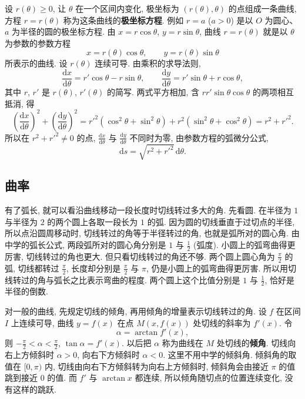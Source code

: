 \documentclass[UTF8,openany]{ctexbook}
\theoremstyle{chinesetextbook}
\newcommand{\dd}{\mathrm d}
\begin{document}
设 $r(\theta)\ge0$, 让 $\theta$ 在一个区间内变化, 极坐标为 $(r(\theta),\theta)$ 的点组成一条曲线, 方程 $r=r(\theta)$ 称为这条曲线的\textbf{极坐标方程}. 例如 $r=a$ ($a>0$) 是以 $O$ 为圆心、$a$ 为半径的圆的极坐标方程. 由 $x=r\cos\theta$, $y=r\sin\theta$, 曲线 $r=r(\theta)$ 就是以 $\theta$ 为参数的参数方程
\[
x=r(\theta)\cos\theta,\qquad y=r(\theta)\sin\theta
\]
所表示的曲线. 设 $r(\theta)$ 连续可导. 由乘积的求导法则,
\[
\frac{\dd x}{\dd\theta}=r'\cos\theta-r\sin\theta,\qquad\frac{\dd y}{\dd\theta}=r'\sin\theta+r\cos\theta,
\]
其中 $r$, $r'$ 是 $r(\theta)$, $r'(\theta)$ 的简写. 两式平方相加, 含 $rr'\sin\theta\cos\theta$ 的两项相互抵消, 得
\[
\left(\frac{\dd x}{\dd\theta}\right)^2+\left(\frac{\dd y}{\dd\theta}\right)^2=r'^2(\cos^2\theta+\sin^2\theta)+r^2(\sin^2\theta+\cos^2\theta)=r^2+r'^2.
\]
所以在 $r^2+r'^2\ne0$ 的点, $\displaystyle\frac{\dd x}{\dd\theta}$ 与 $\displaystyle\frac{\dd y}{\dd\theta}$ 不同时为零, 由参数方程的弧微分公式,
\[
\dd s=\sqrt{r^2+r'^2}\,\dd\theta.
\]
\subsection{曲率}
有了弧长, 就可以看沿曲线移动一段长度时切线转过多大的角. 先看圆. 在半径为 $1$ 与半径为 $2$ 的两个圆上各取一段长为 $1$ 的弧. 因为圆的切线垂直于过切点的半径, 所以点沿圆周移动时, 切线转过的角等于半径转过的角, 也就是弧所对的圆心角. 由中学的弧长公式, 两段弧所对的圆心角分别是 $1$ 与 $\displaystyle\frac12$ (弧度). 小圆上的弧弯曲得更厉害, 切线转过的角也更大. 但只看切线转过的角还不够. 两个圆上圆心角为 $\displaystyle\frac\pi2$ 的弧, 切线都转过 $\displaystyle\frac\pi2$, 长度却分别是 $\displaystyle\frac\pi2$ 与 $\pi$, 仍是小圆上的弧弯曲得更厉害. 所以用切线转过的角与弧长之比表示弯曲的程度. 两个圆上这个比值分别是 $1$ 与 $\displaystyle\frac12$, 恰好是半径的倒数.

对一般的曲线, 先规定切线的倾角, 再用倾角的增量表示切线转过的角. 设 $f$ 在区间 $I$ 上连续可导, 曲线 $y=f(x)$ 在点 $M(x,f(x))$ 处切线的斜率为 $f'(x)$. 令
\[
\alpha=\arctan f'(x),
\]
则 $\displaystyle-\frac\pi2<\alpha<\frac\pi2$, $\tan\alpha=f'(x)$. 以后把 $\alpha$ 称为曲线在 $M$ 处切线的\textbf{倾角}. 切线向右上方倾斜时 $\alpha>0$, 向右下方倾斜时 $\alpha<0$. 这里不用中学的倾斜角. 倾斜角的取值在 $[0,\pi)$ 内, 切线由向右下方倾斜转为向右上方倾斜时, 倾斜角会由接近 $\pi$ 的值跳到接近 $0$ 的值. 而 $f'$ 与 $\arctan x$ 都连续, 所以倾角随切点的位置连续变化, 没有这样的跳跃.
\end{document}
